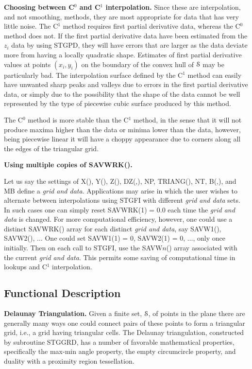 \documentclass[twoside]{MATH77}
\begin{document}
{\bf Choosing between C$^0$ and C$^1$ interpolation.}
Since these are interpolation, and not smoothing, methods, they are
most appropriate for data that has very little noise.
The C$^1$ method requires first partial derivative data, whereas the C$^0$
method does not.  If the first partial derivative data have been estimated
from the $z_i$ data by using STGPD, they will have errors that are
larger as the data deviate more from having a locally quadratic shape.
Estimates of first partial derivative values at points $(x_i, y_i)$
on the boundary of the convex hull of {$\EuScript S$} may
be particularly bad.  The interpolation surface defined by the
C$^1$ method can easily have unwanted sharp peaks and valleys due to
errors in the first partial derivative data, or simply due to the
possibility that the shape of the data cannot be well represented
by the type of piecewise cubic surface produced by this method.

The C$^0$ method is more stable than the C$^1$ method,
in the sense that it will not produce
maxima higher than the data or minima lower than the data, however,
being piecewise linear it will have a choppy appearance due to
corners along all the edges of the triangular grid.

{\bf Using multiple copies of SAVWRK().}

Let us say the settings of X(), Y(), Z(), DZ(,), NP, TRIANG(), NT, B(,),
and MB define a {\em grid and data}.  Applications may arise in which the
user wishes to alternate between interpolations using STGFI with different
{\em grid and data} sets.  In such cases one can simply reset SAVWRK(1) =
0.0 each time the {\em grid and data} is changed.  For more computational
efficiency, however, one could use a distinct SAVWRK() array for each
distinct {\em grid and data}, say SAVW1(), SAVW2(), $\ldots$ One could set
SAVW1(1) = 0, SAVW2(1) = 0, $\ldots$, only once initially.  Then on each
call to STGFI, use the SAVW$n$() array associated with the current {\em
grid and data}.  This permits some saving of computational time in lookups
and C$^1$ interpolation.

\subsection{Functional Description}

{\bf Delaunay Triangulation.}
Given a finite set, {$\EuScript S$}, of points in the plane there are
generally many ways one could connect pairs of these points to form
a triangular grid, i.e., a grid having triangular cells.  The
Delaunay triangulation, constructed by subroutine STGGRD, has a number
of favorable mathematical properties, specifically the max-min angle
property, the empty circumcircle property, and duality with
a proximity region tessellation.
\end{document}
